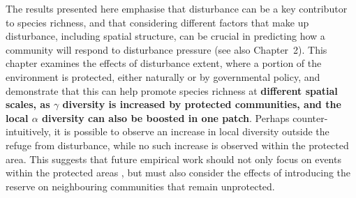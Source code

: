  The results presented here emphasise that disturbance can be a key contributor to species richness, and that considering different factors that make up disturbance, including spatial structure, can be crucial in predicting how a community will respond to disturbance pressure (see also Chapter~2). This chapter examines the effects of disturbance extent, where a portion of the environment is protected, either naturally or by governmental policy, and demonstrate that this can help promote species richness at \textbf{different spatial scales, as $\gamma$ diversity is increased by protected communities, and the local $\alpha$ diversity can also be boosted in one patch}. Perhaps counter-intuitively, it is possible to observe an increase in local diversity outside the refuge from disturbance, while no such increase is observed within the protected area. This suggests that  future empirical work should not only focus on events within the protected areas \citep[e.g.][]{pyvsek2002plant,kitchner1982predictors}, but must also consider the effects of introducing the reserve on neighbouring communities that remain unprotected.
 
